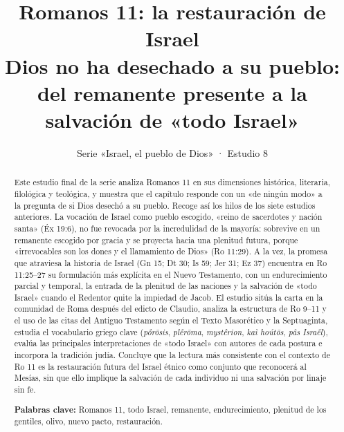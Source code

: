 \title{\color{ladrillo}\bfseries Romanos 11: la restauración de Israel\\[4pt]\large\color{cafe}\mdseries Dios no ha desechado a su pueblo: del remanente presente a la salvación de «todo Israel»}
\author{}\date{\color{sepia}Serie «Israel, el pueblo de Dios» · Estudio 8}

\maketitle\thispagestyle{empty}

\begin{abstract}\noindent
Este estudio final de la serie analiza Romanos 11 en sus dimensiones histórica, literaria, filológica y teológica, y muestra que el capítulo responde con un «de ningún modo» a la pregunta de si Dios desechó a su pueblo. Recoge así los hilos de los siete estudios anteriores. La vocación de Israel como pueblo escogido, «reino de sacerdotes y nación santa» (Éx 19:6), no fue revocada por la incredulidad de la mayoría: sobrevive en un remanente escogido por gracia y se proyecta hacia una plenitud futura, porque «irrevocables son los dones y el llamamiento de Dios» (Ro 11:29). A la vez, la promesa que atraviesa la historia de Israel (Gn 15; Dt 30; Is 59; Jer 31; Ez 37) encuentra en Ro 11:25--27 su formulación más explícita en el Nuevo Testamento, con un endurecimiento parcial y temporal, la entrada de la plenitud de las naciones y la salvación de «todo Israel» cuando el Redentor quite la impiedad de Jacob. El estudio sitúa la carta en la comunidad de Roma después del edicto de Claudio, analiza la estructura de Ro 9--11 y el uso de las citas del Antiguo Testamento según el Texto Masorético y la Septuaginta, estudia el vocabulario griego clave (\emph{pṓrōsis}, \emph{plḗrōma}, \emph{mystḗrion}, \emph{kaì hoútōs}, \emph{pâs Israḗl}), evalúa las principales interpretaciones de «todo Israel» con autores de cada postura e incorpora la tradición judía. Concluye que la lectura más consistente con el contexto de Ro 11 es la restauración futura del Israel étnico como conjunto que reconocerá al Mesías, sin que ello implique la salvación de cada individuo ni una salvación por linaje sin fe.
\par\smallskip\noindent\textbf{Palabras clave:} Romanos 11, todo Israel, remanente, endurecimiento, plenitud de los gentiles, olivo, nuevo pacto, restauración.
\end{abstract}

